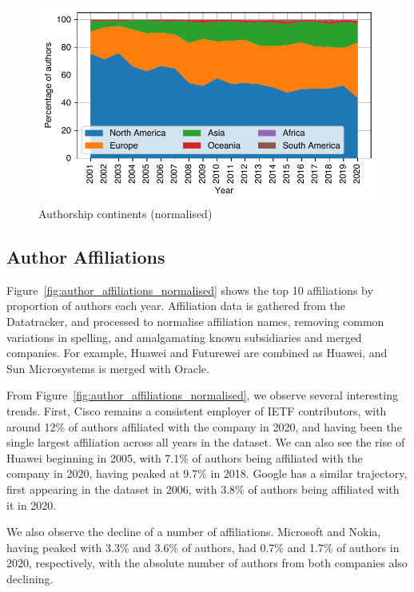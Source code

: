 \documentclass[twocolumn,10pt]{article}
\newlength{\figureWidthOneColumn}
\begin{document}
\begin{figure}
  \centering
  \includegraphics[width=\figureWidthOneColumn]{figures-prev/imc-2021/authors/continents_normalised.pdf}
  \caption{
    Authorship continents (normalised)
  }
  \label{fig:author_continents_normalised}
\end{figure}

\subsection{Author Affiliations}
Figure~\ref{fig:author_affiliations_normalised} shows the top 10
affiliations by proportion of authors each year. Affiliation data is
gathered from the Datatracker, and processed to normalise affiliation
names, removing common variations in spelling, and amalgamating known
subsidiaries and merged companies. For example, Huawei and Futurewei are
combined as Huawei, and Sun Microsystems is merged with Oracle.

From Figure~\ref{fig:author_affiliations_normalised}, we observe several
interesting trends.  First, Cisco remains a consistent employer of IETF
contributors, with around 12\% of authors affiliated with the company in
2020, and having been the single largest affiliation across all years in
the dataset. We can also see the rise of Huawei beginning in 2005, with
7.1\% of authors being affiliated with the company in 2020, having peaked
at 9.7\% in 2018. Google has a similar trajectory, first appearing in the
dataset in 2006, with 3.8\% of authors being affiliated with it in 2020.

We also observe the decline of a number of affiliations.  Microsoft and
Nokia, having peaked with 3.3\% and 3.6\% of authors, had 0.7\% and 1.7\%
of authors in 2020, respectively, with the absolute number of authors from
both companies also declining.
\end{document}
